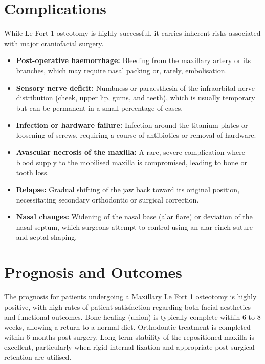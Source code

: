 \section*{Complications}
While Le Fort 1 osteotomy is highly successful, it carries inherent risks associated with major craniofacial surgery.
\begin{itemize}
    \item \textbf{Post-operative haemorrhage:} Bleeding from the maxillary artery or its branches, which may require nasal packing or, rarely, embolisation.
    \item \textbf{Sensory nerve deficit:} Numbness or paraesthesia of the infraorbital nerve distribution (cheek, upper lip, gums, and teeth), which is usually temporary but can be permanent in a small percentage of cases.
    \item \textbf{Infection or hardware failure:} Infection around the titanium plates or loosening of screws, requiring a course of antibiotics or removal of hardware.
    \item \textbf{Avascular necrosis of the maxilla:} A rare, severe complication where blood supply to the mobilised maxilla is compromised, leading to bone or tooth loss.
    \item \textbf{Relapse:} Gradual shifting of the jaw back toward its original position, necessitating secondary orthodontic or surgical correction.
    \item \textbf{Nasal changes:} Widening of the nasal base (alar flare) or deviation of the nasal septum, which surgeons attempt to control using an alar cinch suture and septal shaping.
\end{itemize}

\section*{Prognosis and Outcomes}
The prognosis for patients undergoing a Maxillary Le Fort 1 osteotomy is highly positive, with high rates of patient satisfaction regarding both facial aesthetics and functional outcomes. Bone healing (union) is typically complete within 6 to 8 weeks, allowing a return to a normal diet. Orthodontic treatment is completed within 6 months post-surgery. Long-term stability of the repositioned maxilla is excellent, particularly when rigid internal fixation and appropriate post-surgical retention are utilised.

